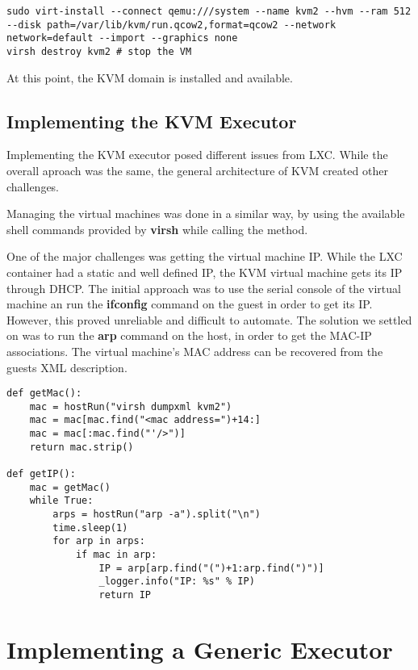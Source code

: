 \lstset{caption=Install the KVM Domain, label=lst:kvm-install}
\begin{lstlisting}
sudo virt-install --connect qemu:///system --name kvm2 --hvm --ram 512 --disk path=/var/lib/kvm/run.qcow2,format=qcow2 --network network=default --import --graphics none
virsh destroy kvm2 # stop the VM
\end{lstlisting}

At this point, the KVM domain is installed and available.

\subsection{Implementing the KVM Executor}
\label{sub-sec:vmc-kvm-executor}

Implementing the KVM executor posed different issues from LXC. While the
overall aproach was the same, the general architecture of KVM created other
challenges. 

Managing the virtual machines was done in a similar way, by using the available
shell commands provided by \textbf{virsh} while calling the  method.

One of the major challenges was getting the virtual machine IP. While the
LXC container had a static and well defined IP, the KVM virtual machine gets
its IP through DHCP. The initial approach was to use the serial console of 
the virtual machine an run the \textbf{ifconfig} command on the guest in order
to get its IP. However, this proved unreliable and difficult to automate. The
solution we settled on was to run the \textbf{arp} command on the host, in order
to get the MAC-IP associations. The virtual machine's MAC address can be
recovered from the guests XML description.

\lstset{caption=Getting the KVM Guest's IP, label=lst:kvm-ip}
\begin{lstlisting}
def getMac():
    mac = hostRun("virsh dumpxml kvm2")
    mac = mac[mac.find("<mac address=")+14:]
    mac = mac[:mac.find("'/>")]
    return mac.strip()
    
def getIP():
    mac = getMac()
    while True:
        arps = hostRun("arp -a").split("\n")
        time.sleep(1)
        for arp in arps:
            if mac in arp:
                IP = arp[arp.find("(")+1:arp.find(")")]
                _logger.info("IP: %s" % IP)
                return IP
\end{lstlisting}
       

\section{Implementing a Generic Executor}
\label{sec:vmc-generic}


